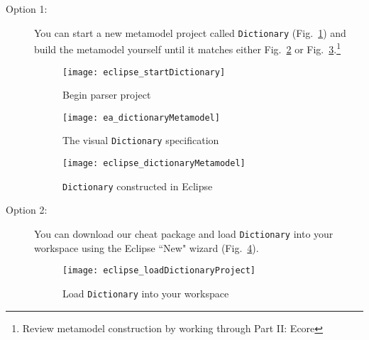 \begin{description}
\item[Option 1:] You can start a new metamodel project called \texttt{Dictionary} (Fig.~\ref{eclipse:startMetamodel}) and build the metamodel yourself until it
matches either Fig.~\ref{ea:dictLang} or Fig.~\ref{eclipse:dictLang}.\footnote{Review metamodel construction by working through Part II: Ecore}

\begin{figure}[htbp]
\begin{center}
  \texttt{[image: eclipse\_startDictionary]}
  \caption{Begin parser project}
  \label{eclipse:startMetamodel}
\end{center}
\end{figure}

\newpage

\vspace*{1cm}

\begin{figure}[htb]
\begin{center}
  \texttt{[image: ea\_dictionaryMetamodel]}
  \caption{The visual \texttt{Dictionary} specification}
  \label{ea:dictLang}
\end{center}
\end{figure}

\vspace{1cm}

\begin{figure}[htb]
\begin{center}
  \texttt{[image: eclipse\_dictionaryMetamodel]}
  \caption{\texttt{Dictionary} constructed in Eclipse}
  \label{eclipse:dictLang}
\end{center}
\end{figure}

\newpage

\newpage
\item[Option 2:] You can download our cheat package and load \texttt{Dictionary} into your workspace using the Eclipse ``New" wizard
(Fig.~\ref{eclipse_cheatPackage}).

\vspace{0.5cm}

\begin{figure}[htbp]
\begin{center}
  \texttt{[image: eclipse\_loadDictionaryProject]}
  \caption{Load \texttt{Dictionary} into your workspace}
  \label{eclipse_cheatPackage}
\end{center}
\end{figure}


\end{description}
